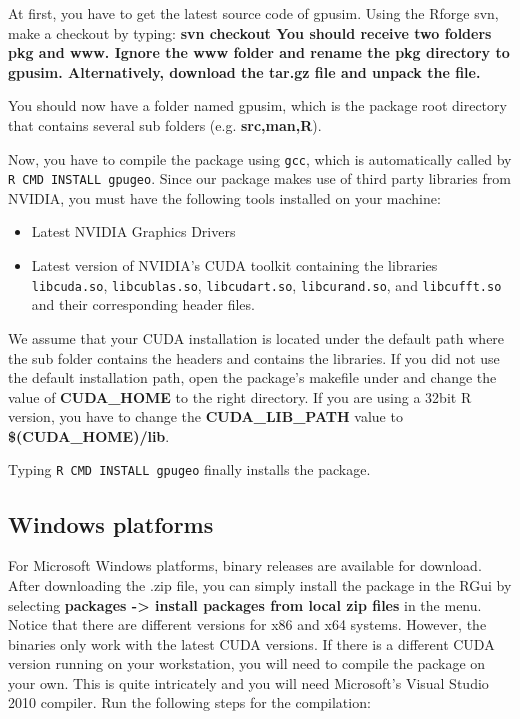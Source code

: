 \documentclass[11pt,oneside,a4paper]{article}
\begin{document}
At first, you have to get the latest source code of gpusim. Using the Rforge svn, make a checkout by typing: \ttfamily \bfseries svn checkout  \normalfont You should receive two folders \ttfamily \textbf{pkg} \normalfont and \ttfamily \textbf{www}\normalfont. Ignore the \ttfamily \textbf{www} \normalfont folder and rename the \ttfamily \textbf{pkg} \normalfont directory to \ttfamily \textbf{gpusim}\normalfont. Alternatively, download the tar.gz file and unpack the file.

You should now have a folder named gpusim, which is the package root directory that contains several sub folders (e.g. \ttfamily \textbf{src,man,R}\normalfont).

Now, you have to compile the package using \verb|gcc|, which is automatically called by \verb|R CMD INSTALL gpugeo|. Since our package makes use of third party libraries from NVIDIA, you must have the following tools installed on your machine:

\begin{itemize}
	\item Latest NVIDIA Graphics Drivers
	\item Latest version of NVIDIA's CUDA toolkit containing the libraries \verb|libcuda.so|, \verb|libcublas.so|, \verb|libcudart.so|, \verb|libcurand.so|, and \verb|libcufft.so| and their corresponding header files. 
\end{itemize}

We assume that your CUDA installation is located under the default path  where the sub folder  contains the headers and  contains the libraries. If you did not use the default installation path, open the package's makefile under   and change the value of \ttfamily \textbf{CUDA\_HOME} \normalfont to the right directory. If you are using a 32bit R version, you have to change the \ttfamily \textbf{CUDA\_LIB\_PATH} \normalfont value to \ttfamily \textbf{\$(CUDA\_HOME)/lib}\normalfont.

Typing \verb|R CMD INSTALL gpugeo| finally installs the package.





\subsection{Windows platforms}
For Microsoft Windows platforms, binary releases are available for download. After downloading the .zip file, you can simply install the package in the RGui by selecting \ttfamily \textbf{packages -> install packages from local zip files} \normalfont in the menu. Notice that there are different versions for x86 and x64 systems. However, the binaries only work with the latest CUDA versions. If there is a different CUDA version running on your workstation, you will need to compile the package on your own.
This is quite intricately and you will need Microsoft's Visual Studio 2010 compiler. Run the following steps for the compilation:
\end{document}
